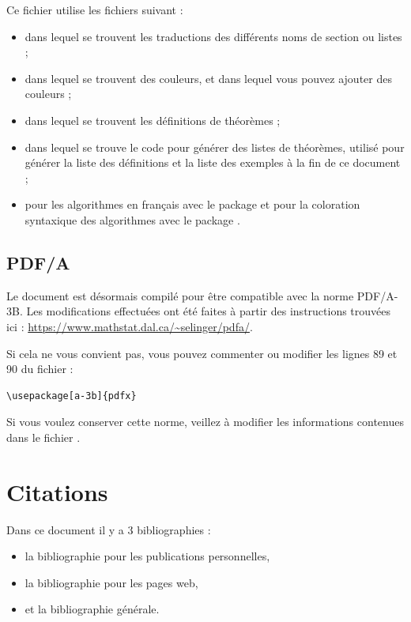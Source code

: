 Ce fichier utilise les fichiers suivant :
\begin{itemize}
  \item {} dans lequel se trouvent les traductions des différents noms de section ou listes ;
  \item {} dans lequel se trouvent des couleurs, et dans lequel vous pouvez ajouter des couleurs ;
  \item {} dans lequel se trouvent les définitions de théorèmes ;
  \item {} dans lequel se trouve le code pour générer des listes de théorèmes, utilisé pour générer la liste des définitions et la liste des exemples à la fin de ce document ;
  \item {} pour les algorithmes en français avec le package  et  pour la coloration syntaxique des algorithmes avec le package .
\end{itemize}

\subsection{PDF/A}

Le document est désormais compilé pour être compatible avec la norme PDF/A-3B.
Les modifications effectuées ont été faites à partir des instructions trouvées ici : \url{https://www.mathstat.dal.ca/~selinger/pdfa/}.

Si cela ne vous convient pas, vous pouvez commenter ou modifier les lignes 89 et 90 du fichier  :

\begin{framed}\vspace{-0.75em}
  \begin{verbatim}
\usepackage[a-3b]{pdfx}\end{verbatim}\vspace{-0.75em}
\end{framed}

Si vous voulez conserver cette norme, veillez à modifier les informations contenues dans le fichier .

\section{Citations}

Dans ce document il y a 3 bibliographies :
\begin{itemize}
  \item la bibliographie pour les publications personnelles,
  \item la bibliographie pour les pages web,
  \item et la bibliographie générale.
\end{itemize}

